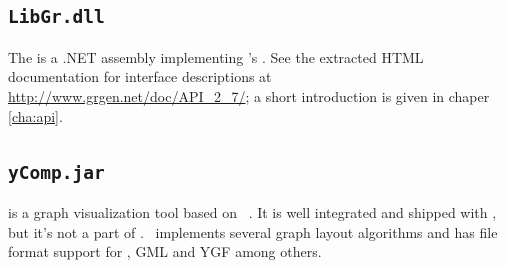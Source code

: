 \subsection{\texttt{LibGr.dll}}
\label{sct:API}
The \LibGr{} is a .NET assembly implementing \GrG's .
See the extracted HTML documentation for interface descriptions at \url{http://www.grgen.net/doc/API_2_7/};
a short introduction is given in chaper \ref{cha:api}. 

\subsection{\texttt{yComp.jar}}
\label{tools:ycomp}
\yComp{} \cite{ycomp} is a graph visualization tool based on \yFiles\ \cite{yfiles}. 
It is well integrated and shipped with \GrG, but it's not a part of \GrG.
\yComp\ implements several graph layout algorithms and has file format support for , GML and YGF among others. 
